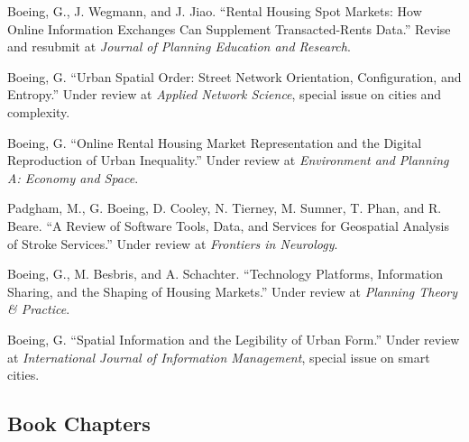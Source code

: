 \documentclass[12pt,letterpaper]{report}
\begin{document}
	\begin{tablist}

		\item[\the\year] \tab Boeing, G., J. Wegmann, and J. Jiao. \enquote{Rental Housing Spot Markets: How Online Information Exchanges Can Supplement Transacted-Rents Data.} Revise and resubmit at \textit{Journal of Planning Education and Research}.

		\item[\the\year] \tab Boeing, G. \enquote{Urban Spatial Order: Street Network Orientation, Configuration, and Entropy.} Under review at \textit{Applied Network Science}, special issue on cities and complexity.

		\item[\the\year] \tab Boeing, G. \enquote{Online Rental Housing Market Representation and the Digital Reproduction of Urban Inequality.} Under review at \textit{Environment and Planning A: Economy and Space}.

		\item[\the\year] \tab Padgham, M., G. Boeing, D. Cooley, N. Tierney, M. Sumner, T. Phan, and R. Beare. \enquote{A Review of Software Tools, Data, and Services for Geospatial Analysis of Stroke Services.} Under review at \textit{Frontiers in Neurology}.

		\item[\the\year] \tab Boeing, G., M. Besbris, and A. Schachter. \enquote{Technology Platforms, Information Sharing, and the Shaping of Housing Markets.} Under review at \textit{Planning Theory \& Practice}.

		\item[\the\year] \tab Boeing, G. \enquote{Spatial Information and the Legibility of Urban Form.} Under review at \textit{International Journal of Information Management}, special issue on smart cities.

	\end{tablist}



	\subsection*{Book Chapters}
\end{document}
